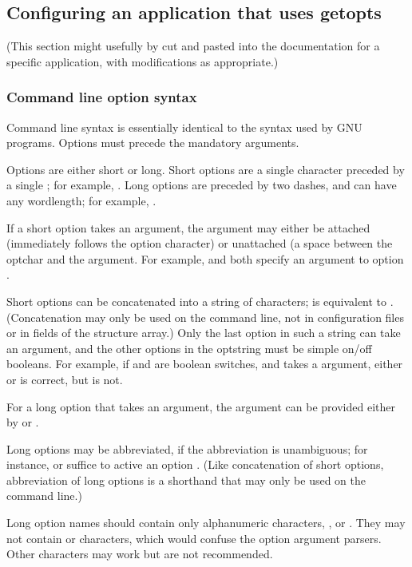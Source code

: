\subsection{Configuring an application that uses getopts}

(This section might usefully by cut and pasted into the documentation
for a specific application, with modifications as appropriate.)

   \subsubsection{Command line option syntax}

Command line syntax is essentially identical to the syntax used by GNU
programs. Options must precede the mandatory arguments.

Options are either short or long. Short options are a single character
preceded by a single \ccode{-}; for example, . Long options
are preceded by two dashes, and can have any wordlength; for example,
.

If a short option takes an argument, the argument may either be
attached (immediately follows the option character) or unattached (a
space between the optchar and the argument. For example, 
and  both specify an argument  to option
.

Short options can be concatenated into a string of characters;
 is equivalent to . (Concatenation may
only be used on the command line, not in configuration files or in
fields of the  structure array.) Only the last
option in such a string can take an argument, and the other options in
the optstring must be simple on/off booleans. For example, if
 and  are boolean switches, and  takes a
 argument, either  or 
is correct, but  is not.

For a long option that takes an argument, the argument can be provided
either by  or .

Long options may be abbreviated, if the abbreviation is unambiguous;
for instance,  or  suffice to active an
option . (Like concatenation of short options,
abbreviation of long options is a shorthand that may only be used on
the command line.)

Long option names should contain only alphanumeric characters,
\ccode{-}, or \ccode{\_}. They may not contain \ccode{=} or \ccode{,}
characters, which would confuse the option argument parsers. Other
characters may work but are not recommended.

